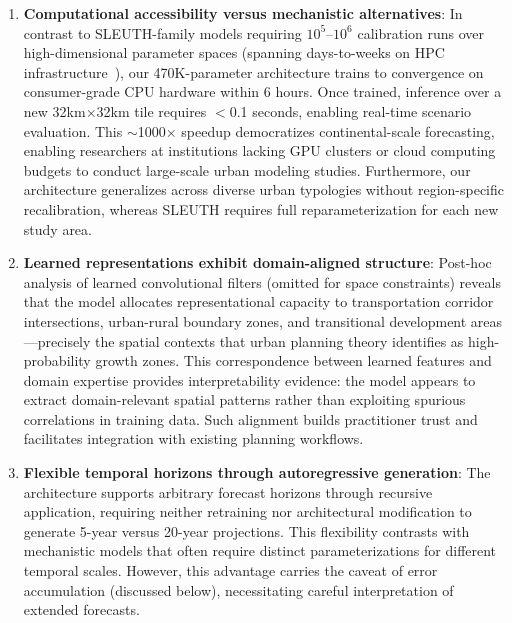 \documentclass[conference]{IEEEtran}
\begin{document}
\begin{enumerate}
    \item \textbf{Computational accessibility versus mechanistic alternatives}: In contrast to SLEUTH-family models requiring $10^5$--$10^6$ calibration runs over high-dimensional parameter spaces (spanning days-to-weeks on HPC infrastructure~\cite{silva2002}), our 470K-parameter architecture trains to convergence on consumer-grade CPU hardware within 6 hours. Once trained, inference over a new 32km$\times$32km tile requires $<$0.1 seconds, enabling real-time scenario evaluation. This $\sim$1000$\times$ speedup democratizes continental-scale forecasting, enabling researchers at institutions lacking GPU clusters or cloud computing budgets to conduct large-scale urban modeling studies. Furthermore, our architecture generalizes across diverse urban typologies without region-specific recalibration, whereas SLEUTH requires full reparameterization for each new study area.
    
    \item \textbf{Learned representations exhibit domain-aligned structure}: Post-hoc analysis of learned convolutional filters (omitted for space constraints) reveals that the model allocates representational capacity to transportation corridor intersections, urban-rural boundary zones, and transitional development areas---precisely the spatial contexts that urban planning theory identifies as high-probability growth zones. This correspondence between learned features and domain expertise provides interpretability evidence: the model appears to extract domain-relevant spatial patterns rather than exploiting spurious correlations in training data. Such alignment builds practitioner trust and facilitates integration with existing planning workflows.
    
    \item \textbf{Flexible temporal horizons through autoregressive generation}: The architecture supports arbitrary forecast horizons through recursive application, requiring neither retraining nor architectural modification to generate 5-year versus 20-year projections. This flexibility contrasts with mechanistic models that often require distinct parameterizations for different temporal scales. However, this advantage carries the caveat of error accumulation (discussed below), necessitating careful interpretation of extended forecasts.
\end{enumerate}
\end{document}
